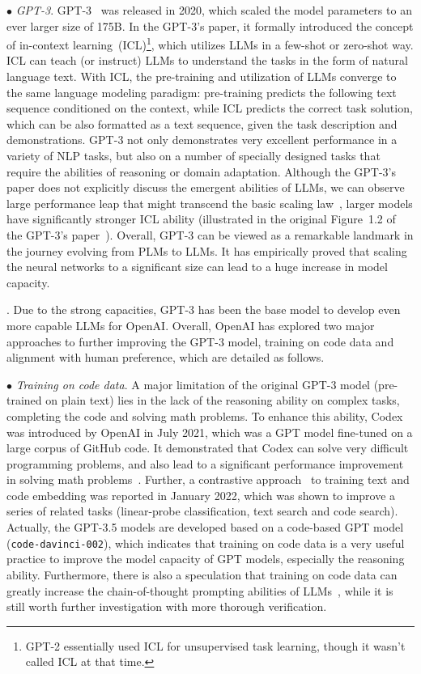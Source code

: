$\bullet$ \emph{GPT-3}. GPT-3~\cite{Brown-NeurIPS-2020-Language} was released in 2020, which scaled the model parameters to an ever larger size of 175B. In the GPT-3's paper, it formally introduced the concept of in-context learning~(ICL)\footnote{GPT-2 essentially used ICL for unsupervised task learning, though it wasn't called ICL at that time.  }, which utilizes LLMs in a few-shot or zero-shot way. ICL can  teach (or instruct) LLMs to understand the tasks  in the form of natural language text. 
With ICL, the pre-training and utilization of LLMs converge to the same language modeling paradigm: pre-training predicts the following text sequence conditioned on the context, while ICL predicts the correct task solution, which can be  also formatted as a text sequence, given the task description and demonstrations. 
GPT-3 not only demonstrates very excellent performance in a variety of NLP tasks, but also on a number of specially designed tasks that require the abilities of reasoning or domain adaptation. Although the GPT-3's paper does not explicitly discuss the emergent abilities of LLMs, we can observe  large performance leap that might transcend the basic scaling law~\cite{Kaplan-arxiv-2020-Scaling}, \eg  larger models have significantly stronger ICL ability (illustrated in the original Figure~1.2 of the GPT-3's  paper~\cite{Brown-NeurIPS-2020-Language}).  Overall, GPT-3 can be viewed as a remarkable landmark in the journey evolving  from PLMs to LLMs.  It has empirically proved that scaling the neural networks to a  significant size can lead to a huge increase in model capacity. 


. Due to the strong capacities,  GPT-3  has been the base model to develop even more capable LLMs for OpenAI. Overall, OpenAI has explored  two major approaches to further improving the GPT-3 model, \ie training on code data and alignment with human preference, which are detailed as follows. 

$\bullet$ \emph{Training on code data}. A major limitation of the original  GPT-3 model  (pre-trained on plain text) lies in the lack of the reasoning ability on complex tasks, \eg completing the code and solving math problems. To enhance this ability,  Codex~\cite{Chen-arxiv-2021-evaluating} was introduced by OpenAI in July 2021, which was a GPT model fine-tuned on 
a large corpus of GitHub code. It demonstrated that Codex can solve very difficult programming problems, and also lead to a significant performance  improvement in solving math problems~\cite{Drori-CoRR-2021-A}. Further, a contrastive approach~\cite{Neelakantan-CoRR-2022-Text} to training text and code embedding was reported in January 2022, which was shown to improve a series of related tasks (\ie  linear-probe classification, text search and code search). Actually, the GPT-3.5 models are developed based on a code-based GPT model (\ie \texttt{code-davinci-002}), which indicates that training on code data is a very useful practice to improve the model capacity  of GPT models, especially the reasoning ability.  
Furthermore, there is  also a speculation  that training on code data can greatly increase the chain-of-thought prompting abilities of LLMs~\cite{FU-blog-2022-how}, while it is still worth further investigation with more thorough verification. 


